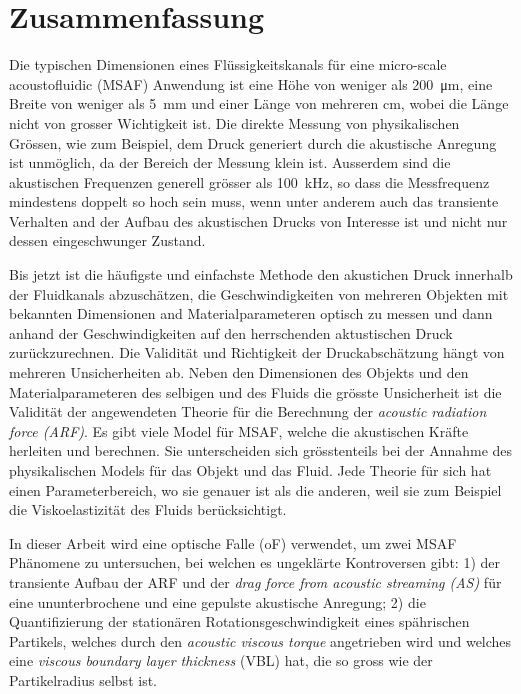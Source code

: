 \chapter*{Zusammenfassung}

Die typischen Dimensionen eines Flüssigkeitskanals für eine micro-scale 
acoustofluidic (MSAF) Anwendung ist eine Höhe von weniger als \SI{200}{\um}, 
eine Breite von weniger als \SI{5}{\mm} und einer Länge von mehreren \si{\cm}, 
wobei die Länge nicht von grosser Wichtigkeit ist. Die direkte Messung von 
physikalischen Grössen, wie zum Beispiel, dem Druck generiert durch die 
akustische Anregung ist unmöglich, da der Bereich der Messung klein ist.  
Ausserdem sind die akustischen Frequenzen generell grösser als 
\SI{100}{\kilo\hertz}, so dass die Messfrequenz mindestens doppelt so hoch sein 
muss, wenn unter anderem auch das transiente Verhalten and der Aufbau des 
akustischen Drucks von Interesse ist und nicht nur dessen eingeschwunger 
Zustand.

Bis jetzt ist die häufigste und einfachste Methode den akustichen Druck 
innerhalb der Fluidkanals abzuschätzen, die Geschwindigkeiten von mehreren 
Objekten mit bekannten Dimensionen and Materialparameteren optisch zu messen 
und dann anhand der Geschwindigkeiten auf den herrschenden aktustischen Druck 
zurückzurechnen. Die Validität und Richtigkeit der Druckabschätzung hängt von 
mehreren Unsicherheiten ab. Neben den Dimensionen des Objekts und den 
Materialparameteren des selbigen und des Fluids die grösste Unsicherheit ist 
die Validität der angewendeten Theorie für die Berechnung der \emph{acoustic 
radiation force (ARF)}. Es gibt viele Model für MSAF, welche die akustischen 
Kräfte herleiten und berechnen.  Sie unterscheiden sich grösstenteils bei der 
Annahme des physikalischen Models für das Objekt und das Fluid. Jede Theorie 
für sich hat einen Parameterbereich, wo sie genauer ist als die anderen, weil 
sie zum Beispiel die Viskoelastizität des Fluids berücksichtigt.

In dieser Arbeit wird eine optische Falle (oF) verwendet, um zwei MSAF 
Phänomene zu untersuchen, bei welchen es ungeklärte Kontroversen gibt: 1) der 
transiente Aufbau der ARF und der \emph{drag force from acoustic streaming 
(AS)} für eine ununterbrochene und eine gepulste akustische Anregung; 2) die 
Quantifizierung der stationären Rotationsgeschwindigkeit eines spährischen 
Partikels, welches durch den \emph{acoustic viscous torque} angetrieben wird 
und welches eine \emph{viscous boundary layer thickness} (VBL) hat, die so 
gross wie der Partikelradius selbst ist.

